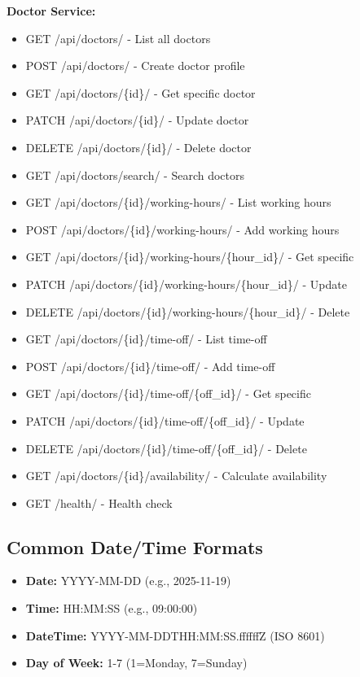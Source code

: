 \documentclass[12pt,a4paper]{article}
\begin{document}
\textbf{Doctor Service:}
\begin{itemize}
    \item GET /api/doctors/ - List all doctors
    \item POST /api/doctors/ - Create doctor profile
    \item GET /api/doctors/\{id\}/ - Get specific doctor
    \item PATCH /api/doctors/\{id\}/ - Update doctor
    \item DELETE /api/doctors/\{id\}/ - Delete doctor
    \item GET /api/doctors/search/ - Search doctors
    \item GET /api/doctors/\{id\}/working-hours/ - List working hours
    \item POST /api/doctors/\{id\}/working-hours/ - Add working hours
    \item GET /api/doctors/\{id\}/working-hours/\{hour\_id\}/ - Get specific
    \item PATCH /api/doctors/\{id\}/working-hours/\{hour\_id\}/ - Update
    \item DELETE /api/doctors/\{id\}/working-hours/\{hour\_id\}/ - Delete
    \item GET /api/doctors/\{id\}/time-off/ - List time-off
    \item POST /api/doctors/\{id\}/time-off/ - Add time-off
    \item GET /api/doctors/\{id\}/time-off/\{off\_id\}/ - Get specific
    \item PATCH /api/doctors/\{id\}/time-off/\{off\_id\}/ - Update
    \item DELETE /api/doctors/\{id\}/time-off/\{off\_id\}/ - Delete
    \item GET /api/doctors/\{id\}/availability/ - Calculate availability
    \item GET /health/ - Health check
\end{itemize}

\subsection{Common Date/Time Formats}

\begin{itemize}
    \item \textbf{Date:} YYYY-MM-DD (e.g., 2025-11-19)
    \item \textbf{Time:} HH:MM:SS (e.g., 09:00:00)
    \item \textbf{DateTime:} YYYY-MM-DDTHH:MM:SS.ffffffZ (ISO 8601)
    \item \textbf{Day of Week:} 1-7 (1=Monday, 7=Sunday)
\end{itemize}
\end{document}
